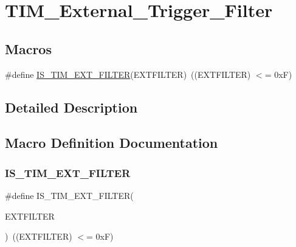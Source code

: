 \hypertarget{group___t_i_m___external___trigger___filter}{}\section{T\+I\+M\+\_\+\+External\+\_\+\+Trigger\+\_\+\+Filter}
\label{group___t_i_m___external___trigger___filter}
\subsection*{Macros}
\begin{DoxyCompactItemize}
\item 
\#define \mbox{\hyperlink{group___t_i_m___external___trigger___filter_ga500df0646edcf07316a55a652502ca87}{I\+S\+\_\+\+T\+I\+M\+\_\+\+E\+X\+T\+\_\+\+F\+I\+L\+T\+ER}}(E\+X\+T\+F\+I\+L\+T\+ER)~((E\+X\+T\+F\+I\+L\+T\+ER) $<$= 0x\+F)
\end{DoxyCompactItemize}


\subsection{Detailed Description}


\subsection{Macro Definition Documentation}
\mbox{\label{group___t_i_m___external___trigger___filter_ga500df0646edcf07316a55a652502ca87}} 
\subsubsection{\texorpdfstring{IS\_TIM\_EXT\_FILTER}{IS\_TIM\_EXT\_FILTER}}
{\footnotesize\ttfamily \#define I\+S\+\_\+\+T\+I\+M\+\_\+\+E\+X\+T\+\_\+\+F\+I\+L\+T\+ER(\begin{DoxyParamCaption}\item[{}]{E\+X\+T\+F\+I\+L\+T\+ER }\end{DoxyParamCaption})~((E\+X\+T\+F\+I\+L\+T\+ER) $<$= 0x\+F)}


